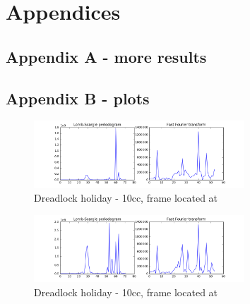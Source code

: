 \documentclass[letterpaper]{article}
\begin{document}
\footnotesize



\newpage

\section{Appendices}

\subsection{Appendix A - more results}

\subsection{Appendix B - plots}

\begin{figure}[h!]
\begin{center}
\includegraphics[width=3.1in,angle=0]{imgs/1frame.png}
\caption{Dreadlock holiday - 10cc, frame located at }
\label{}
\end{center}
\end{figure}

\begin{figure}[h!]
\begin{center}
\includegraphics[width=3.1in,angle=0]{imgs/2frames.png}
\caption{Dreadlock holiday - 10cc, frame located at }
\label{}
\end{center}
\end{figure}
\end{document}
